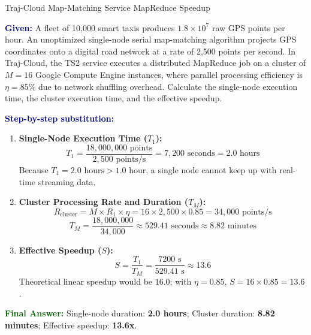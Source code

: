\documentclass[11pt,a4paper,openany]{report}
\newcommand{\Given}{\par\textbf{\textcolor{navy}{Given:}} }
\newcommand{\Steps}{\par\textbf{\textcolor{navy}{Step-by-step substitution:}}\par}
\newcommand{\Answer}{\par\textbf{\textcolor{darkgreen}{Final Answer:}} }
\begin{document}
\begin{solved}{Traj-Cloud Map-Matching Service MapReduce Speedup}
\Given A fleet of 10,000 smart taxis produces $1.8 \times 10^7$ raw GPS points per hour. An unoptimized single-node serial map-matching algorithm projects GPS coordinates onto a digital road network at a rate of 2,500 points per second. In Traj-Cloud, the TS2 service executes a distributed MapReduce job on a cluster of $M = 16$ Google Compute Engine instances, where parallel processing efficiency is $\eta = 85\%$ due to network shuffling overhead.
Calculate the single-node execution time, the cluster execution time, and the effective speedup.
\Steps
\begin{enumerate}[leftmargin=*]
  \item \textbf{Single-Node Execution Time ($T_1$):}
  \begin{equation}
  T_1 = \frac{18,000,000\text{ points}}{2,500\text{ points/s}} = 7,200\text{ seconds} = 2.0\text{ hours}
  \end{equation}
  Because $T_1 = 2.0\text{ hours} > 1.0\text{ hour}$, a single node cannot keep up with real-time streaming data.
  \item \textbf{Cluster Processing Rate and Duration ($T_M$):}
  \begin{equation}
  R_{\text{cluster}} = M \times R_1 \times \eta = 16 \times 2,500 \times 0.85 = 34,000\text{ points/s}
  \end{equation}
  \begin{equation}
  T_M = \frac{18,000,000}{34,000} \approx 529.41\text{ seconds} \approx 8.82\text{ minutes}
  \end{equation}
  \item \textbf{Effective Speedup ($S$):}
  \begin{equation}
  S = \frac{T_1}{T_M} = \frac{7200\text{ s}}{529.41\text{ s}} \approx 13.6
  \end{equation}
  Theoretical linear speedup would be $16.0$; with $\eta = 0.85$, $S = 16 \times 0.85 = 13.6$.
\end{enumerate}
\Answer Single-node duration: \textbf{2.0 hours}; Cluster duration: \textbf{8.82 minutes}; Effective speedup: \textbf{13.6x}.
\end{solved}
\end{document}
